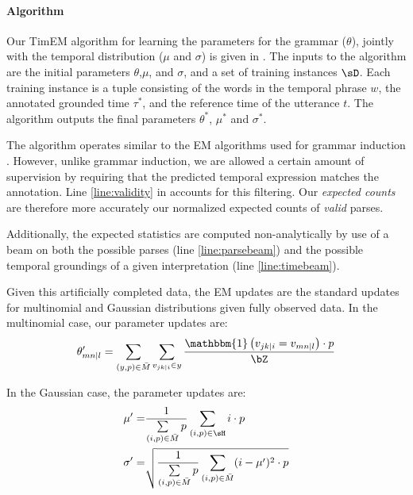 \paragraph{Algorithm}
Our TimEM algorithm for learning the parameters for the grammar ($\theta$),
	jointly with the temporal distribution ($\mu$ and $\sigma$) is given 
	in .
The inputs to the algorithm are the initial parameters $\theta$,$\mu$, and
	$\sigma$, and a set of training instances $\sD$.
Each training instance is a tuple consisting of the words in the temporal
	phrase $w$, the annotated grounded time $\tau^*$, and the reference time
	of the utterance $t$.
The algorithm outputs the final parameters $\theta^*$, $\mu^*$ and $\sigma^*$.

The algorithm operates similar to the EM algorithms used for grammar induction
	\cite{key:2004klein-induction,key:1992carroll-induction}.
However, unlike grammar induction, we are allowed a certain amount of
	supervision by requiring that the predicted temporal expression
	matches the annotation.
Line \ref{line:validity} in  accounts for this filtering.
Our \textit{expected counts} are therefore more accurately our normalized
	expected counts of \textit{valid} parses.

Additionally, the expected statistics are computed non-analytically by use of
	a beam on both the possible parses (line \ref{line:parsebeam}) and the
	possible temporal groundings of a given interpretation (line
	\ref{line:timebeam}).

Given this artificially completed data, the EM updates are the standard
	updates for multinomial and Gaussian distributions given fully observed data.
In the multinomial case, our parameter updates are:
\begin{equation}
	\theta_{mn \mid l}' =
		\sum\limits_{(y,p) \in \bar M} \sum\limits_{v_{jk \mid i} \in y}
		\frac{
			\mathbbm{1}\left(v_{jk \mid i} = v_{mn \mid l}\right) \cdot p
		}{
			\bZ
		}
\label{eqn:multinomialEM}
\end{equation}

In the Gaussian case, the parameter updates are:
\begin{align}
	\mu' =&
		\frac{ 1 } { \sum\limits_{(i,p) \in \bar M}  p }
		\sum\limits_{(i,p) \in \sH} i \cdot p \\
	\sigma' =& \sqrt{
		\frac{ 1 } { \sum\limits_{(i,p) \in \bar M}  p }
		\sum\limits_{(i,p) \in \bar M} (i-\mu')^2 \cdot p
	}
\label{eqn:gaussianEM}
\end{align}

